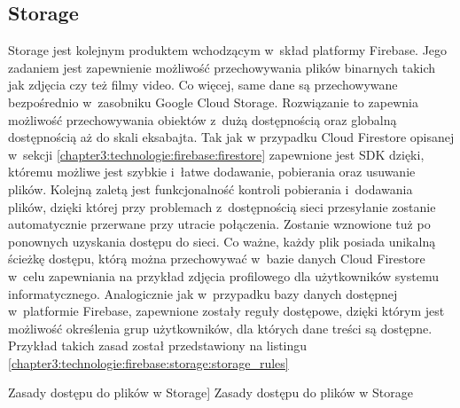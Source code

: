 \documentclass[../Kamil_Kowalewski_Main.tex]{subfiles}
\begin{document}
{{        \subsection{Storage}
        \label{chapter3:technologie:firebase:storage} {
            Storage jest kolejnym produktem wchodzącym w~skład platformy Firebase. Jego
            zadaniem jest zapewnienie możliwość przechowywania plików binarnych takich jak
            zdjęcia czy też filmy video. Co więcej, same dane są przechowywane bezpośrednio
            w~zasobniku Google Cloud Storage. Rozwiązanie to zapewnia możliwość
            przechowywania obiektów z~dużą dostępnością oraz globalną dostępnością aż do
            skali eksabajta. Tak jak w przypadku Cloud Firestore opisanej w~sekcji
            \ref{chapter3:technologie:firebase:firestore} zapewnione jest SDK dzięki,
            któremu możliwe jest szybkie i~łatwe dodawanie, pobierania oraz usuwanie
            plików. Kolejną zaletą jest funkcjonalność kontroli pobierania i~dodawania
            plików, dzięki której przy problemach z~dostępnością sieci przesyłanie
            zostanie automatycznie przerwane przy utracie połączenia. Zostanie wznowione tuż
            po ponownych uzyskania dostępu do sieci. Co ważne, każdy plik posiada
            unikalną ścieżkę dostępu, którą można przechowywać w~bazie danych Cloud
            Firestore w~celu zapewniania na przykład zdjęcia profilowego dla użytkowników
            systemu informatycznego. Analogicznie jak w~przypadku bazy danych dostępnej
            w~platformie Firebase, zapewnione zostały reguły dostępowe, dzięki którym
            jest możliwość określenia grup użytkowników, dla których dane treści są
            dostępne. Przykład takich zasad został przedstawiony na listingu
            \ref{chapter3:technologie:firebase:storage:storage_rules}
            \begin{code}[H]
                
                \caption
                [Zasady dostępu do plików w Storage]
                {Zasady dostępu do plików w Storage}
                \label{chapter3:technologie:firebase:storage:storage_rules}
            \end{code}
        }

}}
\end{document}
